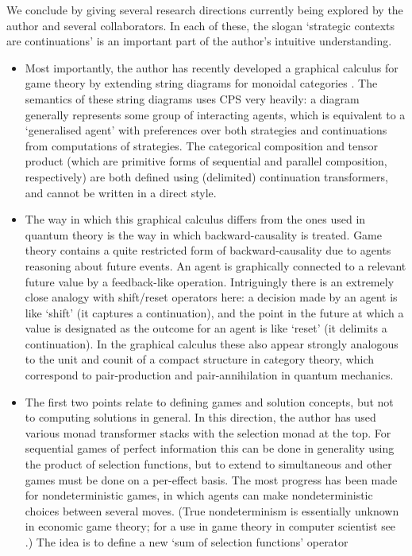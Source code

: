 \documentclass{article}
\begin{document}
We conclude by giving several research directions currently being explored by the author and several collaborators. In each of these, the slogan `strategic contexts are continuations' is an important part of the author's intuitive understanding.

\begin{itemize}
\item Most importantly, the author has recently developed a graphical calculus for game theory by extending string diagrams for monoidal categories \citep{selinger11}. The semantics of these string diagrams uses CPS very heavily: a diagram generally represents some group of interacting agents, which is equivalent to a `generalised agent' with preferences over both strategies and continuations from computations of strategies. The categorical composition and tensor product (which are primitive forms of sequential and parallel composition, respectively) are both defined using (delimited) continuation transformers, and cannot be written in a direct style.

\item The way in which this graphical calculus differs from the ones used in quantum theory is the way in which backward-causality is treated. Game theory contains a quite restricted form of backward-causality due to agents reasoning about future events. An agent is graphically connected to a relevant future value by a feedback-like operation. Intriguingly there is an extremely close analogy with shift/reset operators \citep{filinski90} here: a decision made by an agent is like `shift' (it captures a continuation), and the point in the future at which a value is designated as the outcome for an agent is like `reset' (it delimits a continuation). In the graphical calculus these also appear strongly analogous to the unit and counit of a compact structure in category theory, which correspond to pair-production and pair-annihilation in quantum mechanics.

\item The first two points relate to defining games and solution concepts, but not to computing solutions in general. In this direction, the author has used various monad transformer stacks with the selection monad at the top. For sequential games of perfect information this can be done in generality using the product of selection functions, but to extend to simultaneous and other games must be done on a per-effect basis. The most progress has been made for nondeterministic games, in which agents can make nondeterministic choices between several moves. (True nondeterminism is essentially unknown in economic game theory; for a use in game theory in computer scientist see \citep[chapter 9]{lavalle06}.) The idea is to define a new `sum of selection functions' operator


\end{itemize}
\end{document}
